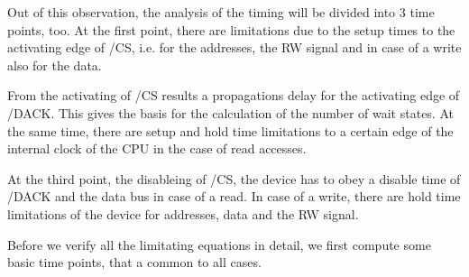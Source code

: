 \documentclass[12pt]{article}
\begin{document}
Out of this observation, the analysis of the timing will be divided
into 3 time points, too. At the first point, there are limitations due
to the setup times to the activating edge of /CS, i.e. for the
addresses, the RW signal and in case of a write also for the data.

From the activating of /CS results a propagations delay for the
activating edge of /DACK. This gives the basis for the calculation of
the number of wait states. At the same time, there are setup and hold
time limitations to a certain edge of the internal clock of the CPU in
the case of read accesses.

At the third point, the disableing of /CS, the device has to obey a
disable time of /DACK and the data bus in case of a read. In case of a
write, there are hold time limitations of the device for addresses,
data and the RW signal.

Before we verify all the limitating equations in detail, we first
compute some basic time points, that a common to all cases.
\end{document}
